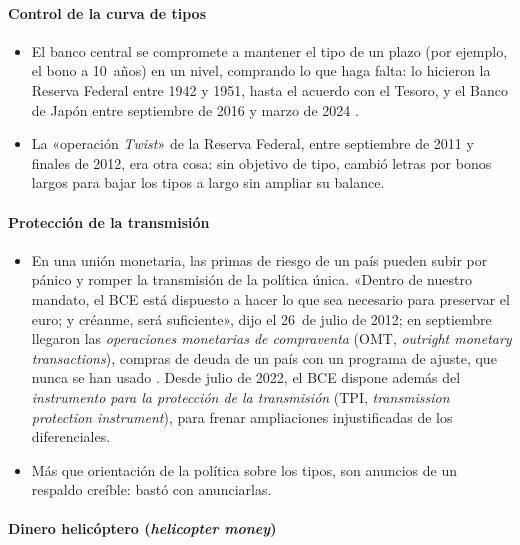 \documentclass[11pt]{article}
\begin{document}
\paragraph{Control de la curva de tipos}

\begin{itemize}
\item El banco central se compromete a mantener el tipo de un plazo (por ejemplo, el bono a 10~años) en un nivel, comprando lo que haga falta: lo hicieron la Reserva Federal entre 1942 y 1951, hasta el acuerdo con el Tesoro\nocite{FedHistory2026Accord}, y el Banco de Japón entre septiembre de 2016 y marzo de 2024\nocite{BoJ2016YCC,BoJ2024Marco} .
\item La «operación \emph{Twist}» de la Reserva Federal, entre septiembre de 2011 y finales de 2012, era otra cosa: sin objetivo de tipo, cambió letras por bonos largos para bajar los tipos a largo sin ampliar su balance\nocite{Fed2011Twist,Fed2012Twist}.
\end{itemize}

\paragraph{Protección de la transmisión}

\begin{itemize}
\item En una unión monetaria, las primas de riesgo de un país pueden subir por pánico y romper la transmisión de la política única. «Dentro de nuestro mandato, el BCE está dispuesto a hacer lo que sea necesario para preservar el euro; y créanme, será suficiente», dijo  el 26~de julio de 2012\nocite{Draghi2012Speech}; en septiembre llegaron las \emph{operaciones monetarias de compraventa} (OMT, \emph{outright monetary transactions}), compras de deuda de un país con un programa de ajuste, que nunca se han usado\nocite{BCE2012OMT} . Desde julio de 2022, el BCE dispone además del \emph{instrumento para la protección de la transmisión} (TPI, \emph{transmission protection instrument}), para frenar ampliaciones injustificadas de los diferenciales\nocite{BCE2022TPI}.
\item Más que orientación de la política sobre los tipos, son anuncios de un respaldo creíble: bastó con anunciarlas.
\end{itemize}

\paragraph{Dinero helicóptero (\emph{helicopter money})}
\end{document}
